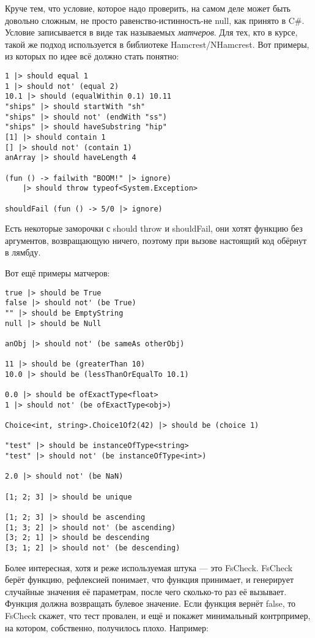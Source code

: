 \documentclass{../../text-style}
\begin{document}
Круче тем, что условие, которое надо проверить, на самом деле может быть довольно сложным, не просто равенство-истинность-не null, как принято в C\#. Условие записывается в виде так называемых \textit{матчеров}. Для тех, кто в курсе, такой же подход используется в библиотеке Hamcrest/NHamcrest. Вот примеры, из которых по идее всё должно стать понятно:

\begin{verbatim}
1 |> should equal 1
1 |> should not' (equal 2)
10.1 |> should (equalWithin 0.1) 10.11
"ships" |> should startWith "sh"
"ships" |> should not' (endWith "ss")
"ships" |> should haveSubstring "hip"
[1] |> should contain 1
[] |> should not' (contain 1)
anArray |> should haveLength 4

(fun () -> failwith "BOOM!" |> ignore) 
    |> should throw typeof<System.Exception>

shouldFail (fun () -> 5/0 |> ignore)
\end{verbatim}

Есть некоторые заморочки с should throw и shouldFail, они хотят функцию без аргументов, возвращающую ничего, поэтому при вызове настоящий код обёрнут в лямбду.

Вот ещё примеры матчеров:

\begin{verbatim}
true |> should be True
false |> should not' (be True)
"" |> should be EmptyString
null |> should be Null

anObj |> should not' (be sameAs otherObj)

11 |> should be (greaterThan 10)
10.0 |> should be (lessThanOrEqualTo 10.1)

0.0 |> should be ofExactType<float>
1 |> should not' (be ofExactType<obj>)

Choice<int, string>.Choice1Of2(42) |> should be (choice 1)

"test" |> should be instanceOfType<string>
"test" |> should not' (be instanceOfType<int>)

2.0 |> should not' (be NaN)

[1; 2; 3] |> should be unique

[1; 2; 3] |> should be ascending
[1; 3; 2] |> should not' (be ascending)
[3; 2; 1] |> should be descending
[3; 1; 2] |> should not' (be descending)
\end{verbatim}

Более интересная, хотя и реже используемая штука --- это FsCheck. FsCheck берёт функцию, рефлексией понимает, что функция принимает, и генерирует случайные значения её параметрам, после чего сколько-то раз её вызывает. Функция должна возвращать булевое значение. Если функция вернёт false, то FsCheck скажет, что тест провален, и ещё и покажет минимальный контрпример, на котором, собственно, получилось плохо. Например: 
\end{document}
